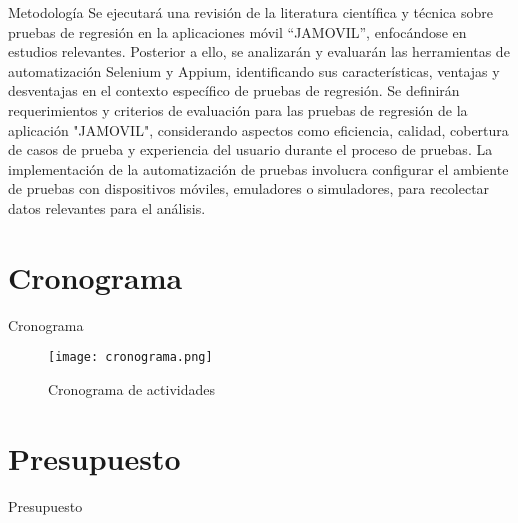 \documentclass{beamer}
\begin{document}
\begin{frame}{Metodología}
\justify
Se ejecutará una revisión de la literatura científica y técnica sobre pruebas de regresión en la aplicaciones móvil “JAMOVIL”, enfocándose en estudios relevantes. Posterior a ello, se analizarán y evaluarán las herramientas de automatización Selenium y Appium, identificando sus características, ventajas y desventajas en el contexto específico de pruebas de regresión.
\newline
\newline
Se definirán requerimientos y criterios de evaluación para las pruebas de regresión de la aplicación "JAMOVIL", considerando aspectos como eficiencia, calidad, cobertura de casos de prueba y experiencia del usuario durante el proceso de pruebas.
La implementación de la automatización de pruebas involucra configurar el ambiente de pruebas con dispositivos móviles, emuladores o simuladores,  para recolectar datos relevantes para el análisis.
\end{frame}


\section{Cronograma}

\begin{frame}{Cronograma}
\begin{figure}[h]
\centering
\texttt{[image: cronograma.png]}
\caption{Cronograma de actividades}
\label{FIG1:1}
\end{figure}
\end{frame}

\section{Presupuesto}
\begin{frame}{Presupuesto}
    
\end{frame}
\end{document}
